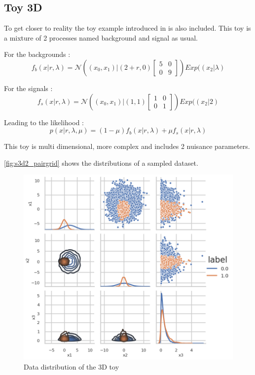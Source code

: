 \subsection{Toy 3D} %
\label{sub:toy_3d}

To get closer to reality the toy example introduced in \cite{DECASTRO2019170inferno} is also included.
This toy is a mixture of 2 processes named background and signal as usual.


For the backgrounds :
$$
f_b (x|r, \lambda) = \mathcal N \left ( (x_0, x_1) | (2+r, 0) 
\begin{bmatrix} 5 & 0 \\ 0 & 9 \end{bmatrix} \right ) Exp((x_2| \lambda)
$$


For the signals :
$$
f_s (x|r, \lambda) = \mathcal N \left ( (x_0, x_1) | (1, 1) 
\begin{bmatrix} 1 & 0 \\ 0 & 1 \end{bmatrix} \right ) Exp((x_2| 2)
$$

Leading to the likelihood :
$$
p(x | r, \lambda, \mu ) = (1-\mu) f_b(x|r, \lambda) + \mu f_s(x|r, \lambda)
$$

This toy is multi dimensional, more complex and includes 2 nuisance parameters.

\autoref{fig:s3d2_pairgrid} shows the distributions of a sampled dataset.

\begin{figure}[htb]
    \includegraphics[width=\linewidth]{s3d2/pairgrid}
    \caption{Data distribution of the 3D toy}
    \label{fig:s3d2_pairgrid}
\end{figure}






